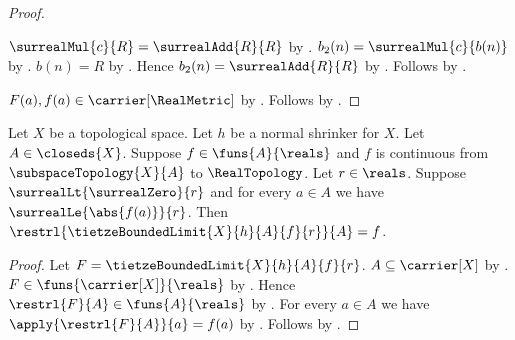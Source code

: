 \begin{proof}
\begin{subproof}
        $\surrealMul{c}{R}=\surrealAdd{R}{R}$
            by
            .
        $b_2(n)=\surrealMul{c}{b(n)}$
            by .
        $b(n)=R$ by .
        Hence $b_2(n)=\surrealAdd{R}{R}$ by \auto.
        Follows by \auto.
    \end{subproof}
    $F(a),f(a)\in\carrier[\RealMetric]$
        by .
    Follows by
        .
\end{proof}

\begin{theorem}\label{tietze_bounded_limit_restriction}
    Let $X$ be a topological space.
    Let $h$ be a normal shrinker for $X$.
    Let $A\in\closeds{X}$.
    Suppose $f\in\funs{A}{\reals}$ and $f$ is continuous from
        $\subspaceTopology{X}{A}$ to $\RealTopology$.
    Let $r\in\reals$.
    Suppose $\surrealLt{\surrealZero}{r}$ and
        for every $a\in A$ we have $\surrealLe{\abs{f(a)}}{r}$.
    Then $\restrl{\tietzeBoundedLimit{X}{h}{A}{f}{r}}{A}=f$.
\end{theorem}
\begin{proof}
    Let $F=\tietzeBoundedLimit{X}{h}{A}{f}{r}$.
    $A\subseteq\carrier[X]$ by .
    $F\in\funs{\carrier[X]}{\reals}$
        by .
    Hence $\restrl{F}{A}\in\funs{A}{\reals}$
        by .
    For every $a\in A$ we have
        $\apply{\restrl{F}{A}}{a}=f(a)$
        by
        .
    Follows by .
\end{proof}


